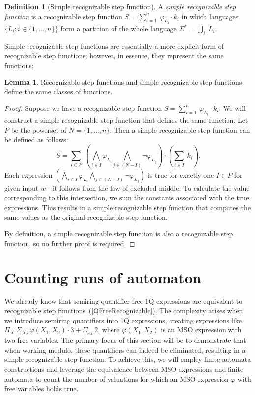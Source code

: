 \documentclass[en]{pracamgr}
\theoremstyle{definition}
\newtheorem{definition}{Definition}[section]
\newtheorem{lemma}[theorem]{Lemma}
\begin{document}
\begin{definition}[Simple recognizable step function]
    \label{DefSimpleRecStepFun}
    A \textit{simple recognizable step function} is a recognizable step function $S = \sum_{i = 1}^{n} \ \varphi_{L_i} \cdot k_i$ in which languages $\{L_i : i \in \{1,\ldots,n\}\}$ form a partition of the whole language $\Sigma^* = \dot{\bigcup}_i \ L_i$.
\end{definition}

Simple recognizable step functions are essentially a more explicit form of recognizable step functions; however, in essence, they represent the same functions:

\begin{lemma}
    \label{RecEqSimpleRec}
    Recognizable step functions and simple recognizable step functions define the same classes of functions.
\end{lemma}

\begin{proof}
    Suppose we have a recognizable step function $S = \sum_{i = 1}^{n} \ \varphi_{L_i} \cdot k_i$. We will construct a simple recognizable step function that defines the same function. Let $P$ be the powerset of $N = \{1,\ldots,n\}$. Then a simple recognizable step function can be defined as follows:
    $$S = \sum_{I \in P} \ (\bigwedge_{i \in I} \varphi_{L_i} \bigwedge_{j \in (N-I)} \neg \varphi_{L_j}) \cdot (\sum_{i \in I} \ k_i).$$
    Each expression $(\bigwedge_{i \in I} \varphi_{L_i} \bigwedge_{j \in (N-I)} \neg \varphi_{L_j})$ is true for exactly one $I \in P$ for given input $w$ - it follows from the law of excluded middle. To calculate the value corresponding to this intersection, we sum the constants associated with the true expressions. This results in a simple recognizable step function that computes the same values as the original recognizable step function.

    By definition, a simple recognizable step function is also a recognizable step function, so no further proof is required.
\end{proof}

\section{Counting runs of automaton}

We already know that semiring quantifier-free 1Q expressions are equivalent to recognizable step functions~(\cref{QFreeRecognizable}). The complexity arises when we introduce semiring quantifiers into 1Q expressions, creating expressions like $\Pi_{X_1} \Sigma_{X_2} \ \varphi(X_1, X_2) \cdot 3 + \Sigma_{x_3} \ 2$, where $\varphi(X_1, X_2)$ is an MSO expression with two free variables. The primary focus of this section will be to demonstrate that when working modulo, these quantifiers can indeed be eliminated, resulting in a simple recognizable step function. To achieve this, we will employ finite automata constructions and leverage the equivalence between MSO expressions and finite automata to count the number of valuations for which an MSO expression $\varphi$ with free variables holds true.
\end{document}
